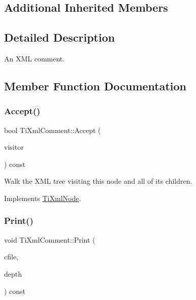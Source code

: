 \subsection*{Additional Inherited Members}


\subsection{Detailed Description}
An X\+ML comment. 

\subsection{Member Function Documentation}
\hypertarget{class_ti_xml_comment_ac894241530d1d266131a5026cb251a95}{}\label{class_ti_xml_comment_ac894241530d1d266131a5026cb251a95} 
\subsubsection{\texorpdfstring{Accept()}{Accept()}}
{\footnotesize\ttfamily bool Ti\+Xml\+Comment\+::\+Accept (\begin{DoxyParamCaption}\item[{\hyperlink{class_ti_xml_visitor}{Ti\+Xml\+Visitor} $\ast$}]{visitor }\end{DoxyParamCaption}) const\hspace{0.3cm}{\ttfamily [virtual]}}

Walk the X\+ML tree visiting this node and all of its children. 

Implements \hyperlink{class_ti_xml_node_acc0f88b7462c6cb73809d410a4f5bb86}{Ti\+Xml\+Node}.

\hypertarget{class_ti_xml_comment_a873171beac19d40f0eaae945711c98ed}{}\label{class_ti_xml_comment_a873171beac19d40f0eaae945711c98ed} 
\subsubsection{\texorpdfstring{Print()}{Print()}}
{\footnotesize\ttfamily void Ti\+Xml\+Comment\+::\+Print (\begin{DoxyParamCaption}\item[{F\+I\+LE $\ast$}]{cfile,  }\item[{int}]{depth }\end{DoxyParamCaption}) const\hspace{0.3cm}{\ttfamily [virtual]}}

